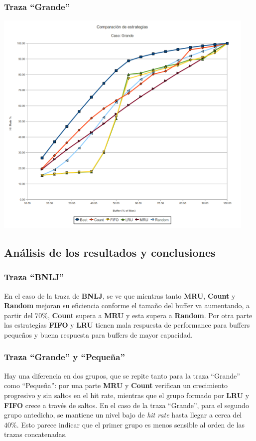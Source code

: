 \subsubsection*{Traza ``Grande''} 
\begin{center}
  \includegraphics[height=11cm]{big.png}
\end{center}  


\subsection{An\'alisis de los resultados y conclusiones}

\subsubsection*{Traza ``BNLJ''}
En el caso de la traza de \textbf{BNLJ}, se ve que mientras tanto \textbf{MRU}, \textbf{Count} y \textbf{Random} mejoran su eficiencia conforme el tama\~no del buffer
va aumentando, a partir del $70\%$, \textbf{Count} supera a \textbf{MRU} y esta supera a \textbf{Random}. Por otra parte las estrategias \textbf{FIFO} y \textbf{LRU} tienen
mala respuesta de performance para buffers peque\~nos y buena respuesta para buffers de mayor capacidad. 

\subsubsection*{Traza ``Grande'' y ``Peque\~na''}

Hay una diferencia en dos grupos, que se repite tanto para la traza ``Grande'' como ``Peque\~na'': por una parte \textbf{MRU} y \textbf{Count} 
verifican un crecimiento progresivo y sin saltos en el hit rate, mientras que el grupo formado por \textbf{LRU} y \textbf{FIFO} 
crece a trav\'es de saltos. En el caso de la traza ``Grande'', para el segundo grupo antedicho, se mantiene un nivel bajo de \textit{hit rate} 
hasta llegar a cerca del $40\%$.  Esto parece indicar que el primer grupo es menos sensible al orden de las trazas concatenadas.


